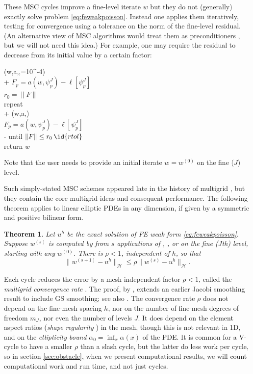 \documentclass[letterpaper,final,12pt,reqno]{amsart}
\theoremstyle{claim}
\newtheorem{theorem}{Theorem}
\numberwithin{equation}{section}
\numberwithin{figure}{section}
\numberwithin{table}{section}
\numberwithin{theorem}{section}
\begin{document}
These MSC cycles improve a fine-level iterate $w$ but they do not (generally) exactly solve problem \eqref{eq:feweakpoisson}.  Instead one applies them iteratively, testing for convergence using a tolerance on the norm of the fine-level residual.  (An alternative view of MSC algorithms would treat them as preconditioners \cite[for example]{Bueler2021}, but we will not need this idea.)  For example, one may require the residual to decrease from its initial value by a certain factor:
\begin{pseudo*} \label{ps:msc-solver}
(w,a,\ell,=10^{-4})\text{:} \\+
    $F_p = a(w,\psi_p^J) - \ell[\psi_p^J]$ \\
    $r_0 = \|F\|$ \\
    repeat \\+
        (w,a,\ell) \qquad\qquad {} \\
        $F_p = a(w,\psi_p^J) - \ell[\psi_p^J]$ \\-
    until $\|F\| \le r_0\, \id{rtol}$ \\
    return $w$
\end{pseudo*}
Note that the user needs to provide an initial iterate $w=w^{(0)}$ on the fine ($J$) level.

Such simply-stated MSC schemes appeared late in the history of multigrid \cite{Xu1992}, but they contain the core multigrid ideas and consequent performance.  The following theorem applies to linear elliptic PDEs in any dimension, if given by a symmetric and positive bilinear form.

\begin{theorem} \label{thm:mscconvergence}  Let $u^h$ be the exact solution of FE weak form \eqref{eq:feweakpoisson}.  Suppose $w^{(s)}$ is computed by from $s$ applications of , , or  on the fine ($J$th) level, starting with any $w^{(0)}$.  There is $\rho<1$, independent of $h$, so that
\begin{equation}
  \|w^{(s+1)} - u^h\|_{\mathcal{H}} \le \rho \|w^{(s)} - u^h\|_{\mathcal{H}}.  \label{eq:mscconvergence}
\end{equation}
\end{theorem}

Each cycle reduces the error by a mesh-independent factor $\rho<1$, called the \emph{multigrid convergence rate} \cite{Braess2007}.  The proof, by \cite{Neuss1998}, extends an earlier Jacobi smoothing result \cite{BraessHackbusch1983} to include GS smoothing; see also \cite[Thm.~3.10]{GraeserKornhuber2009}.  The convergence rate $\rho$ does not depend on the fine-mesh spacing $h$, nor on the number of fine-mesh degrees of freedom $m_J$, nor even the number of levels $J$.  It does depend on the element aspect ratios (\emph{shape regularity} \cite{Elmanetal2014}) in the mesh, though this is not relevant in 1D, and on the \emph{ellipticity bound} $\alpha_0=\inf_x \alpha(x)$ of the PDE.  It is common for a V-cycle to have a smaller $\rho$ than a slash cycle, but the latter do less work per cycle, so in section \ref{sec:obstacle}, when we present computational results, we will count computational work and run time, and not just cycles.
\end{document}
